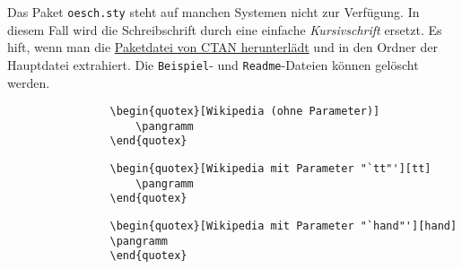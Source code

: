 			\begin{redbox}
				Das Paket \texttt{oesch.sty} steht auf manchen Systemen nicht zur Verfügung. In diesem Fall wird die {\oeschfamily Schreibschrift} durch eine einfache \emph{Kursivschrift} ersetzt. Es hift, wenn man die \href{https://www.ctan.org/tex-archive/fonts/oesch?lang=de}{Paketdatei von CTAN herunterlädt} und in den Ordner der Hauptdatei extrahiert. Die \texttt{Beispiel}- und \texttt{Readme}-Dateien können gelöscht werden.
			\end{redbox}


			\begin{verbatim}
				\begin{quotex}[Wikipedia (ohne Parameter)]
				    \pangramm
				\end{quotex}
			\end{verbatim}


			\begin{verbatim}
				\begin{quotex}[Wikipedia mit Parameter "`tt"'][tt]
				    \pangramm
				\end{quotex}
			\end{verbatim}


			\begin{verbatim}
				\begin{quotex}[Wikipedia mit Parameter "`hand"'][hand]
				\pangramm
				\end{quotex}
			\end{verbatim}


